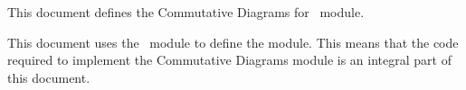 
\startchapter[title=Overview]

This document defines the Commutative Diagrams for \ConTeXt\ module.

This document uses the  \ConTeXt\ module to 
define the  module. This means that the code required to 
implement the Commutative Diagrams module is an integral part of this document. 

\stopchapter